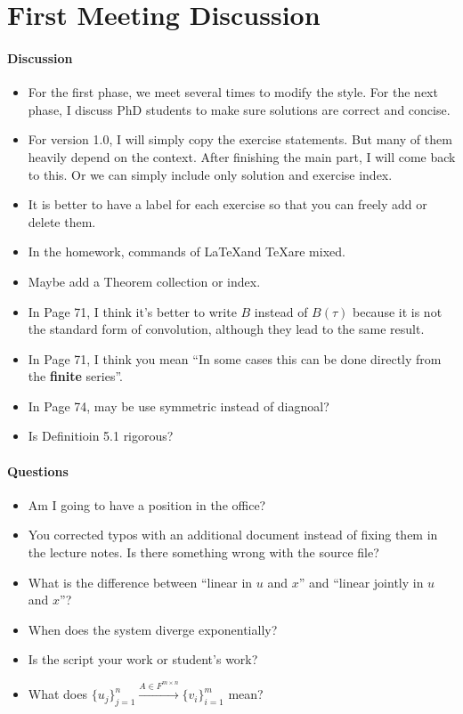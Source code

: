 \chapter{First Meeting Discussion}

\subsubsection*{Discussion}
\begin{itemize}
\item For the first phase, we meet several times to modify the style. For the next phase, I discuss PhD students to make sure solutions are correct and concise.
\item For version 1.0, I will simply copy the exercise statements. But many of them heavily depend on the context. After finishing the main part, I will come back to this. Or we can simply include only solution and exercise index.
\item It is better to have a label for each exercise so that you can freely add or delete them.
\item In the homework, commands of \LaTeX and \TeX are mixed.
\item Maybe add a Theorem collection or index.
\item In Page 71, I think it's better to write $B$ instead of $B(\tau)$ because it is not the standard form of convolution, although they lead to the same result.
\item In Page 71, I think you mean ``In some cases this can be done directly from the \textbf{finite} series''.
\item In Page 74, may be use symmetric instead of diagnoal?
\item Is Definitioin 5.1 rigorous?
\end{itemize}

\subsubsection*{Questions}
\begin{itemize}
\item Am I going to have a position in the office?
\item You corrected typos with an additional document instead of fixing them in the lecture notes. Is there something wrong with the source file?
\item What is the difference between ``linear in $u$ and $x$'' and ``linear jointly in $u$ and $x$''?
\item When does the system diverge exponentially?
\item Is the script your work or student's work?
\item What does $\{u_j\}_{j=1}^n \xrightarrow[]{A \in F^{m \times n}} \{v_i\}_{i=1}^m$ mean?
\end{itemize}